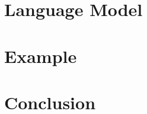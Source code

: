 \documentclass{llncs}
\begin{document}
\begin{prooftree}
\end{prooftree}

\newpage
\section{Language Model}

\newpage
\section{Example}

\newpage
\section{Conclusion}
\end{document}
